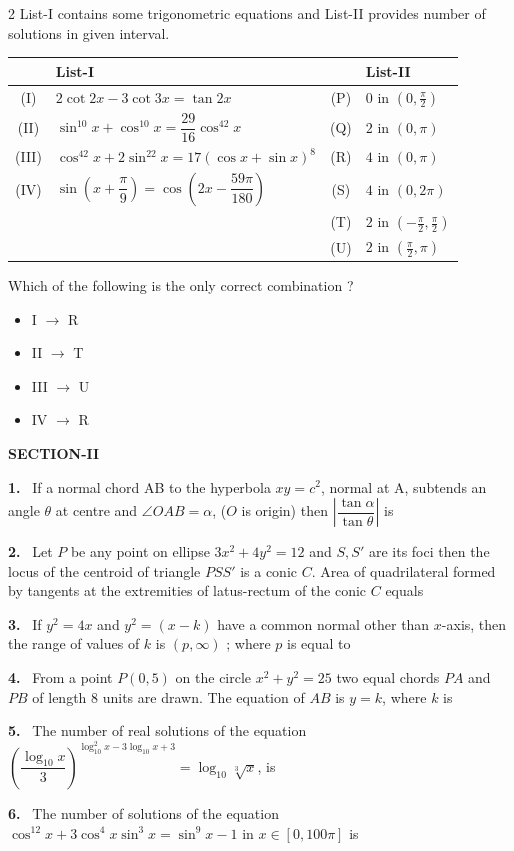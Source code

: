 \documentclass[10pt]{extarticle}
\newcommand{\sect}[1]{\par\smallskip\noindent\textbf{#1}\par}
\newcommand{\qn}[1]{\par\smallskip\noindent\textbf{#1.}~}
\newenvironment{qoptions}{\begin{itemize}[leftmargin=1.8em,itemsep=1pt,topsep=2pt,label={}]}{\end{itemize}}
\newcommand{\opt}[2]{\item[(#1)] #2}
\begin{document}
\begin{multicols}{2}
List-I contains some trigonometric equations and List-II provides number of solutions in given interval.

\begin{center}
{\footnotesize\setlength{\tabcolsep}{2pt}\begin{tabular}{|c|p{4.6cm}|c|p{2.4cm}|}\hline
 & \centering List-I & & \centering List-II\tabularnewline\hline
(I) & $2\cot2x-3\cot3x=\tan2x$ & (P) & $0$ in $\left(0,\frac\pi2\right)$\\\hline
(II) & $\sin^{10}x+\cos^{10}x=\dfrac{29}{16}\cos^42x$ & (Q) & $2$ in $(0,\pi)$\\\hline
(III) & $\cos^42x+2\sin^22x=17(\cos x+\sin x)^8$ & (R) & $4$ in $(0,\pi)$\\\hline
(IV) & $\sin\left(x+\dfrac\pi9\right)=\cos\left(2x-\dfrac{59\pi}{180}\right)$ & (S) & $4$ in $(0,2\pi)$\\\hline
 & & (T) & $2$ in $\left(-\frac\pi2,\frac\pi2\right)$\\\hline
 & & (U) & $2$ in $\left(\frac\pi2,\pi\right)$\\\hline
\end{tabular}}
\end{center}
Which of the following is the only correct combination ?
\begin{qoptions}
\opt{A}{I $\to$ R}
\opt{B}{II $\to$ T}
\opt{C}{III $\to$ U}
\opt{D}{IV $\to$ R}
\end{qoptions}
\sect{SECTION-II}
\qn{1} If a normal chord AB to the hyperbola $xy=c^2$, normal at A, subtends an angle $\theta$ at centre and $\angle OAB=\alpha$, ($O$ is origin) then $\left|\dfrac{\tan\alpha}{\tan\theta}\right|$ is
\qn{2} Let $P$ be any point on ellipse $3x^2+4y^2=12$ and $S,S'$ are its foci then the locus of the centroid of triangle $PSS'$ is a conic $C$. Area of quadrilateral formed by tangents at the extremities of latus-rectum of the conic $C$ equals
\qn{3} If $y^2=4x$ and $y^2=(x-k)$ have a common normal other than $x$-axis, then the range of values of $k$ is $(p,\infty)$ ; where $p$ is equal to
\qn{4} From a point $P(0,5)$ on the circle $x^2+y^2=25$ two equal chords $PA$ and $PB$ of length $8$ units are drawn. The equation of $AB$ is $y=k$, where $k$ is
\qn{5} The number of real solutions of the equation $\left(\dfrac{\log_{10}x}{3}\right)^{\log_{10}^2x-3\log_{10}x+3}=\log_{10}\sqrt[3]{x}$, is
\qn{6} The number of solutions of the equation $\cos^{12}x+3\cos^4x\sin^3x=\sin^9x-1$ in $x\in[0,100\pi]$ is
\end{multicols}
\end{document}
